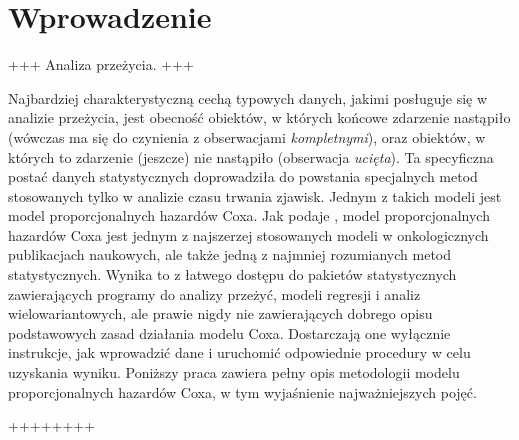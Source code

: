 \chapter*{Wprowadzenie}


+++
Analiza przeżycia.
+++

Najbardziej charakterystyczną cechą typowych danych, jakimi posługuje się w analizie przeżycia, jest obecność obiektów, w których końcowe zdarzenie nastąpiło (wówczas ma się do czynienia z obserwacjami \textit{kompletnymi}), oraz obiektów, w których to zdarzenie (jeszcze) nie nastąpiło (obserwacja \textit{ucięta}). Ta specyficzna postać danych statystycznych doprowadziła do powstania specjalnych metod stosowanych tylko w analizie czasu trwania zjawisk. Jednym z takich modeli jest model proporcjonalnych hazardów Coxa. Jak podaje \cite{assel}, model proporcjonalnych hazardów Coxa jest jednym z najszerzej stosowanych modeli w onkologicznych publikacjach naukowych, ale także jedną z najmniej rozumianych metod statystycznych. Wynika to z łatwego dostępu do pakietów statystycznych zawierających programy do analizy przeżyć, modeli regresji i analiz wielowariantowych, ale prawie nigdy nie zawierających dobrego opisu podstawowych zasad działania modelu Coxa. Dostarczają one wyłącznie instrukcje, jak wprowadzić dane i uruchomić odpowiednie procedury w celu uzyskania wyniku. Poniższy praca zawiera pełny opis metodologii modelu proporcjonalnych hazardów Coxa, w tym wyjaśnienie najważniejszych pojęć. 


++++++++